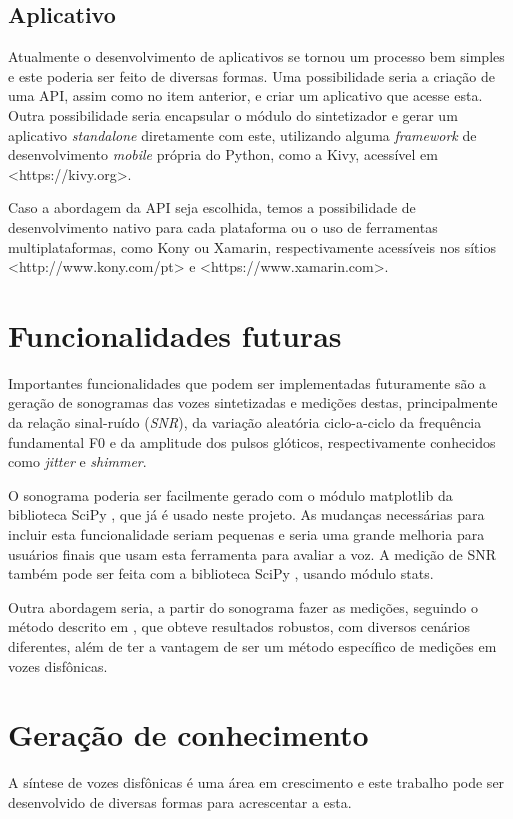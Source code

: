 \documentclass[
  12pt,       
  openright,      
  twoside,      
  a4paper,      
  english,      
  french,       
  spanish,      
  brazil,     
  ]{abntex2}
\begin{document}
\subsection{Aplicativo}
Atualmente o desenvolvimento de aplicativos se tornou um processo bem simples e este poderia ser feito de diversas formas. Uma possibilidade seria a criação de uma API, assim como no item anterior, e criar um aplicativo que acesse esta. Outra possibilidade seria encapsular o módulo do sintetizador e gerar um aplicativo \textit{standalone} diretamente com este, utilizando alguma \textit{framework} de desenvolvimento \textit{mobile} própria do Python, como a Kivy, acessível em <https://kivy.org>.

Caso a abordagem da API seja escolhida, temos a possibilidade de desenvolvimento nativo para cada plataforma ou o uso de ferramentas multiplataformas, como Kony ou Xamarin, respectivamente acessíveis nos sítios <http://www.kony.com/pt> e <https://www.xamarin.com>.

\section{Funcionalidades futuras}
\label{subsec:funcionalidadesFuturas}
Importantes funcionalidades que podem ser implementadas futuramente são a geração de sonogramas das vozes sintetizadas e medições destas, principalmente da relação sinal-ruído (\textit{SNR}), da variação aleatória ciclo-a-ciclo da frequência fundamental F0 e da amplitude dos pulsos glóticos, respectivamente conhecidos como \textit{jitter} e \textit{shimmer}.

O sonograma poderia ser facilmente gerado com o módulo matplotlib da biblioteca SciPy \cite{scipy}, que já é usado neste projeto. As mudanças necessárias para incluir esta funcionalidade seriam pequenas e seria uma grande melhoria para usuários finais que usam esta ferramenta para avaliar a voz. A medição de SNR também pode ser feita com a biblioteca SciPy \cite{scipy}, usando módulo stats.

Outra abordagem seria, a partir do sonograma fazer as medições, seguindo o método descrito em , que obteve resultados robustos, com diversos cenários diferentes, além de ter a vantagem de ser um método específico de medições em vozes disfônicas.

\section{Geração de conhecimento}
\label{subsec:geracaoConhecimento}
A síntese de vozes disfônicas é uma área em crescimento e este trabalho pode ser desenvolvido de diversas formas para acrescentar a esta.
\end{document}
